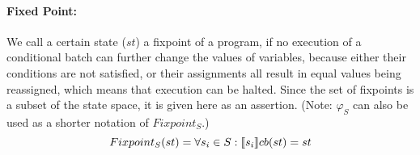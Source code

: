 \paragraph{Fixed Point:}
We call a certain state ($st$) a fixpoint of a program, if no execution of a conditional batch can further change the values of variables, because either their conditions are not satisfied, or their assignments all result in equal values being reassigned, which means that execution can be halted. Since the set of fixpoints is a subset of the state space, it is given here as an assertion. (Note: $\varphi_S$ can also be used as a shorter notation of $Fixpoint_S$.)
\begin{equation}
    Fixpoint_S(st) = \forall s_i \in S : \llbracket s_i \rrbracket cb(st) = st
\end{equation}
\begin{code}
    \>[2]\AgdaSpace{}%
    \AgdaSymbol{:}\AgdaSpace{}%
    \AgdaSpace{}%
    \AgdaSpace{}%
    \<%
    \\
    \>[2]\AgdaSpace{}%
    \AgdaSpace{}%
    \AgdaSymbol{=}\AgdaSpace{}%
    \AgdaSpace{}%
    \AgdaSpace{}%
    \AgdaSpace{}%
    \AgdaSpace{}%
    \AgdaSpace{}%
    \AgdaSpace{}%
    \AgdaSpace{}%
    \AgdaSpace{}%
    \AgdaSpace{}%
    \AgdaSpace{}%
    \AgdaSpace{}%
    \AgdaSpace{}%
    \AgdaSymbol{)}\AgdaSpace{}%
    \<%
    \\
    \\[\AgdaEmptyExtraSkip]%
    \>[2]\AgdaSpace{}%
    \AgdaSpace{}%
    \<%
    \\
    \>[2]\AgdaSpace{}%
    \AgdaSymbol{:}\AgdaSpace{}%
    \AgdaSpace{}%
    \AgdaSpace{}%
    \<%
    \\
    \>[2]\AgdaOperator{\AgdaFunction{φ[}}\AgdaSpace{}%
    \AgdaSpace{}%
    \AgdaOperator{\AgdaFunction{]}}\AgdaSpace{}%
    \AgdaSymbol{=}\AgdaSpace{}%
    \AgdaSpace{}%
    \<%
\end{code}

